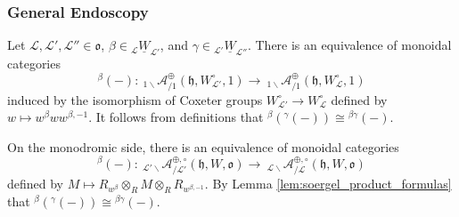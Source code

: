 \documentclass{amsart}
\newcommand{\scrL}{\mathcal{L}}
\newcommand{\fr}[1]{\mathfrak{#1}}
\newcommand{\Amon}[2]{\:_{#1 \backslash} \mathcal{A}_{/ #2} }
\newcommand{\uW}[2]{{}_{#1}\underline{W}_{#2}}
\theoremstyle{definition}
\numberwithin{equation}{subsection}
\begin{document}
\subsubsection{General Endoscopy}

Let $\scrL, \scrL', \scrL'' \in \fr{o}$, $\beta \in \uW{\scrL}{\scrL'}$, and $\gamma \in \uW{\scrL'}{\scrL''}$. There is an equivalence of monoidal categories
\[{}^{\beta} (-) : \Amon{1}{1}^{\oplus} (\fr{h}, W_{\scrL'}^{\circ}, 1) \to \Amon{1}{1}^{\oplus} (\fr{h}, W_{\scrL}^{\circ}, 1) \]
induced by the isomorphism of Coxeter groups $W_{\scrL'}^{\circ} \to W_{\scrL}^{\circ}$ defined by $w \mapsto w^{\beta} w w^{\beta, -1}$.
It follows from definitions that ${}^{\beta} ( {}^{\gamma} (-)) \cong {}^{\beta \gamma} (-)$.

On the monodromic side, there is an equivalence of monoidal categories
\[{}^{\beta} (-) : \Amon{\scrL'}{\scrL'}^{\oplus, \circ} (\fr{h}, W, \fr{o}) \to \Amon{\scrL}{\scrL}^{\oplus, \circ} (\fr{h}, W, \fr{o}) \]
defined by $M \mapsto R_{w^{\beta}} \otimes_R M \otimes_R R_{w^{\beta, -1}}$. By Lemma \ref{lem:soergel_product_formulas} that ${}^{\beta} ( {}^{\gamma} (-)) \cong {}^{\beta \gamma} (-)$.
\end{document}
